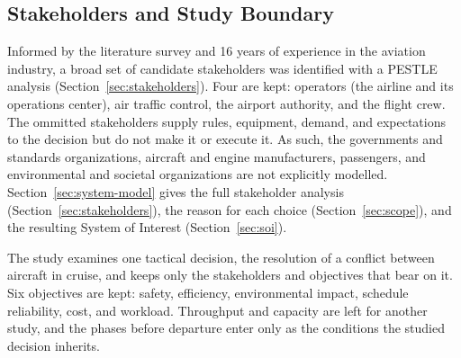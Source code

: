 \subsection{Stakeholders and Study Boundary}
\label{sec:stakeholders-summary}

Informed by the literature survey and 16 years of experience in the aviation industry, a broad set of candidate stakeholders was identified with a PESTLE analysis (Section~\ref{sec:stakeholders}). Four are kept: operators (the airline and its operations center), air traffic control, the airport authority, and the flight crew. The ommitted stakeholders supply rules, equipment, demand, and expectations to the decision but do not make it or execute it. As such, the governments and standards organizations, aircraft and engine manufacturers, passengers, and environmental and societal organizations are not explicitly modelled. Section~\ref{sec:system-model} gives the full stakeholder analysis (Section~\ref{sec:stakeholders}), the reason for each choice (Section~\ref{sec:scope}), and the resulting System of Interest (Section~\ref{sec:soi}).

The study examines one tactical decision, the resolution of a conflict between aircraft in cruise, and keeps only the stakeholders and objectives that bear on it. Six objectives are kept: safety, efficiency, environmental impact, schedule reliability, cost, and workload. Throughput and capacity are left for another study, and the phases before departure enter only as the conditions the studied decision inherits. 

